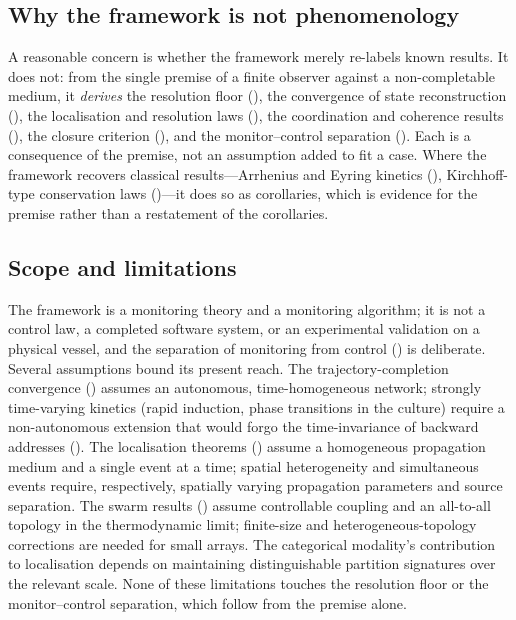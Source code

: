\documentclass[11pt,twocolumn,a4paper]{article}
\theoremstyle{thmstyle}
\theoremstyle{definition}
\theoremstyle{remark}
\begin{document}
\subsection{Why the framework is not phenomenology}

A reasonable concern is whether the framework merely re-labels known
results. It does not: from the single premise of a finite observer against a
non-completable medium, it \emph{derives} the resolution floor
(), the convergence of state reconstruction
(), the localisation and resolution laws
(), the coordination and coherence
results (), the closure criterion
(), and the monitor--control separation
(). Each is a consequence
of the premise, not an assumption added to fit a case. Where the framework
recovers classical results---Arrhenius and Eyring kinetics
(), Kirchhoff-type conservation laws
()---it does so as corollaries, which is evidence for
the premise rather than a restatement of the corollaries.

\subsection{Scope and limitations}

The framework is a monitoring theory and a monitoring algorithm; it is not
a control law, a completed software system, or an experimental validation on
a physical vessel, and the separation of monitoring from control
() is deliberate. Several assumptions bound its present
reach. The trajectory-completion convergence ()
assumes an autonomous, time-homogeneous network; strongly time-varying
kinetics (rapid induction, phase transitions in the culture) require a
non-autonomous extension that would forgo the time-invariance of backward
addresses (). The localisation theorems
() assume a homogeneous propagation medium and a
single event at a time; spatial heterogeneity and simultaneous events
require, respectively, spatially varying propagation parameters and source
separation. The swarm results () assume controllable
coupling and an all-to-all topology in the thermodynamic limit; finite-size
and heterogeneous-topology corrections are needed for small arrays. The
categorical modality's contribution to localisation depends on maintaining
distinguishable partition signatures over the relevant scale. None of these
limitations touches the resolution floor or the monitor--control separation,
which follow from the premise alone.
\end{document}
